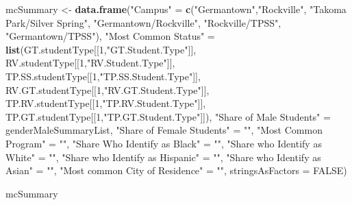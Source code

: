 \documentclass[]{article}
\newenvironment{Shaded}{\begin{snugshade}}{\end{snugshade}}
\newcommand{\KeywordTok}[1]{\textcolor[rgb]{0.13,0.29,0.53}{\textbf{#1}}}
\newcommand{\DataTypeTok}[1]{\textcolor[rgb]{0.13,0.29,0.53}{#1}}
\newcommand{\DecValTok}[1]{\textcolor[rgb]{0.00,0.00,0.81}{#1}}
\newcommand{\StringTok}[1]{\textcolor[rgb]{0.31,0.60,0.02}{#1}}
\newcommand{\OtherTok}[1]{\textcolor[rgb]{0.56,0.35,0.01}{#1}}
\newcommand{\NormalTok}[1]{#1}
\begin{document}
\begin{Shaded}
\begin{Highlighting}[]
\NormalTok{mcSummary <-}\StringTok{ }\KeywordTok{data.frame}\NormalTok{(}\StringTok{"Campus"}\NormalTok{ =}\StringTok{ }\KeywordTok{c}\NormalTok{(}\StringTok{"Germantown"}\NormalTok{,}\StringTok{"Rockville"}\NormalTok{, }\StringTok{"Takoma Park/Silver Spring"}\NormalTok{, }\StringTok{"Germantown/Rockville"}\NormalTok{,}
                                     \StringTok{"Rockville/TPSS"}\NormalTok{, }\StringTok{"Germantown/TPSS"}\NormalTok{), }
                        \StringTok{"Most Common Status"}\NormalTok{ =}\StringTok{ }\KeywordTok{list}\NormalTok{(GT.studentType[[}\DecValTok{1}\NormalTok{,}\StringTok{"GT.Student.Type"}\NormalTok{]], RV.studentType[[}\DecValTok{1}\NormalTok{,}\StringTok{"RV.Student.Type"}\NormalTok{]],}
\NormalTok{                         TP.SS.studentType[[}\DecValTok{1}\NormalTok{,}\StringTok{"TP.SS.Student.Type"}\NormalTok{]], RV.GT.studentType[[}\DecValTok{1}\NormalTok{,}\StringTok{"RV.GT.Student.Type"}\NormalTok{]],}
\NormalTok{                         TP.RV.studentType[[}\DecValTok{1}\NormalTok{,}\StringTok{"TP.RV.Student.Type"}\NormalTok{]], TP.GT.studentType[[}\DecValTok{1}\NormalTok{,}\StringTok{"TP.GT.Student.Type"}\NormalTok{]]),}
                        \StringTok{"Share of Male Students"}\NormalTok{ =}\StringTok{ }\NormalTok{genderMaleSummaryList,}
                        \StringTok{"Share of Female Students"}\NormalTok{ =}\StringTok{ ""}\NormalTok{,}
                        \StringTok{"Most Common Program"}\NormalTok{ =}\StringTok{ ""}\NormalTok{,}
                        \StringTok{"Share Who Identify as Black"}\NormalTok{ =}\StringTok{ ""}\NormalTok{,}
                        \StringTok{"Share who Identify as White"}\NormalTok{ =}\StringTok{ ""}\NormalTok{,}
                        \StringTok{"Share who Identify as Hispanic"}\NormalTok{ =}\StringTok{ ""}\NormalTok{,}
                        \StringTok{"Share who Identify as Asian"}\NormalTok{ =}\StringTok{ ""}\NormalTok{,}
                        \StringTok{"Most common City of Residence"}\NormalTok{ =}\StringTok{ ""}\NormalTok{, }
                        \DataTypeTok{stringsAsFactors =} \OtherTok{FALSE}\NormalTok{)}

\NormalTok{mcSummary}
\end{Highlighting}
\end{Shaded}
\end{document}
